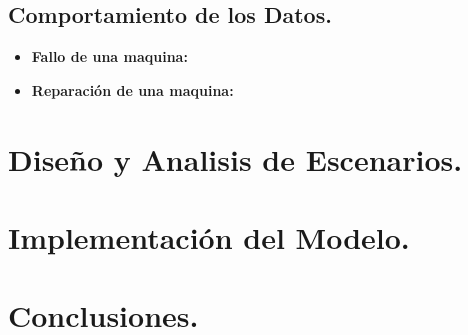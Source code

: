 \documentclass[10pt]{article}
\begin{document}
\subsection{Comportamiento de los Datos.}

\begin{itemize}
\item \textbf{Fallo de una maquina:}
\item \textbf{Reparación de una maquina:}

\end{itemize}



\section{Diseño y Analisis de Escenarios.} 


\section{Implementación del Modelo.}




\section{Conclusiones.}
\end{document}
